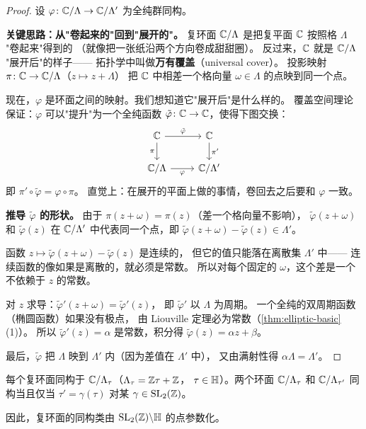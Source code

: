 \begin{proof}
设 $\varphi\colon \mathbb{C}/\Lambda \to \mathbb{C}/\Lambda'$ 为全纯群同构。

\textbf{关键思路：从"卷起来的"回到"展开的"。}
复环面 $\mathbb{C}/\Lambda$ 是把复平面 $\mathbb{C}$ 按照格 $\Lambda$ "卷起来"得到的
（就像把一张纸沿两个方向卷成甜甜圈）。
反过来，$\mathbb{C}$ 就是 $\mathbb{C}/\Lambda$ "展开后"的样子——
拓扑学中叫做\textbf{万有覆盖}（universal cover）。
投影映射 $\pi\colon \mathbb{C} \to \mathbb{C}/\Lambda$（$z \mapsto z + \Lambda$）
把 $\mathbb{C}$ 中相差一个格向量 $\omega \in \Lambda$ 的点映到同一个点。

现在，$\varphi$ 是环面之间的映射。我们想知道它"展开后"是什么样的。
覆盖空间理论保证：$\varphi$ 可以"提升"为一个全纯函数
$\tilde\varphi\colon \mathbb{C} \to \mathbb{C}$，使得下图交换：
\[
  \begin{tikzcd}
    \C \arrow[r, "\tilde\varphi"] \arrow[d, "\pi"'] & \C \arrow[d, "\pi'"] \\
    \C/\Lambda \arrow[r, "\varphi"'] & \C/\Lambda'
  \end{tikzcd}
\]
即 $\pi' \circ \tilde\varphi = \varphi \circ \pi$。
直觉上：在展开的平面上做的事情，卷回去之后要和 $\varphi$ 一致。

\textbf{推导 $\tilde\varphi$ 的形状。}
由于 $\pi(z + \omega) = \pi(z)$（差一个格向量不影响），
$\tilde\varphi(z + \omega)$ 和 $\tilde\varphi(z)$ 在 $\mathbb{C}/\Lambda'$
中代表同一个点，即
$\tilde\varphi(z + \omega) - \tilde\varphi(z) \in \Lambda'$。

函数 $z \mapsto \tilde\varphi(z + \omega) - \tilde\varphi(z)$ 是连续的，
但它的值只能落在离散集 $\Lambda'$ 中——
连续函数的像如果是离散的，就必须是常数。
所以对每个固定的 $\omega$，这个差是一个不依赖于 $z$ 的常数。

对 $z$ 求导：$\tilde\varphi'(z + \omega) = \tilde\varphi'(z)$，
即 $\tilde\varphi'$ 以 $\Lambda$ 为周期。
一个全纯的双周期函数（椭圆函数）如果没有极点，
由 Liouville 定理必为常数（\cref{thm:elliptic-basic}(1)）。
所以 $\tilde\varphi'(z) = \alpha$ 是常数，积分得 $\tilde\varphi(z) = \alpha z + \beta$。

最后，$\tilde\varphi$ 把 $\Lambda$ 映到 $\Lambda'$ 内（因为差值在 $\Lambda'$ 中），
又由满射性得 $\alpha\Lambda = \Lambda'$。
\end{proof}

\begin{corollary}
\label{cor:torus-tau}
每个复环面同构于 $\mathbb{C}/\Lambda_\tau$（$\Lambda_\tau = \mathbb{Z}\tau + \mathbb{Z}$，
$\tau \in \mathbb{H}$）。两个环面 $\mathbb{C}/\Lambda_\tau$ 和 $\mathbb{C}/\Lambda_{\tau'}$
同构当且仅当 $\tau' = \gamma(\tau)$ 对某 $\gamma \in \mathrm{SL}_2(\mathbb{Z})$。

因此，复环面的同构类由 $\mathrm{SL}_2(\mathbb{Z}) \backslash \mathbb{H}$ 的点参数化。
\end{corollary}

